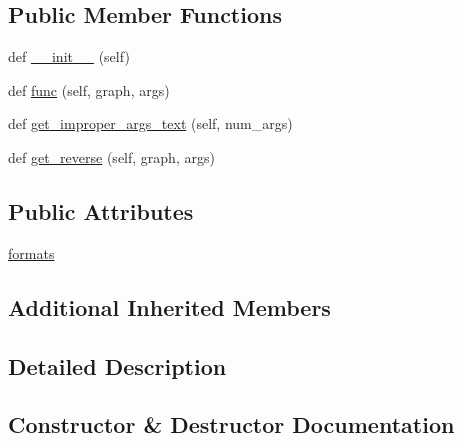 \subsection*{Public Member Functions}
\begin{DoxyCompactItemize}
\item 
def \hyperlink{classlight__chats_1_1graph_1_1UnlockFunction_a307201afcd25d90e5c99badda71e0f02}{\+\_\+\+\_\+init\+\_\+\+\_\+} (self)
\item 
def \hyperlink{classlight__chats_1_1graph_1_1UnlockFunction_a60b9bd71f3b3d8255c9f79a3a408914f}{func} (self, graph, args)
\item 
def \hyperlink{classlight__chats_1_1graph_1_1UnlockFunction_a25cc5dcf53d2d9bc588ab635aeb376eb}{get\+\_\+improper\+\_\+args\+\_\+text} (self, num\+\_\+args)
\item 
def \hyperlink{classlight__chats_1_1graph_1_1UnlockFunction_a8527e0ee7a1f29a4daf4899451cdaa6f}{get\+\_\+reverse} (self, graph, args)
\end{DoxyCompactItemize}
\subsection*{Public Attributes}
\begin{DoxyCompactItemize}
\item 
\hyperlink{classlight__chats_1_1graph_1_1UnlockFunction_a8e80f007572fa2ce7624eca4ec645a56}{formats}
\end{DoxyCompactItemize}
\subsection*{Additional Inherited Members}


\subsection{Detailed Description}
\begin{DoxyVerb}
\end{DoxyVerb}
 

\subsection{Constructor \& Destructor Documentation}
\mbox{\label{classlight__chats_1_1graph_1_1UnlockFunction_a307201afcd25d90e5c99badda71e0f02}} 
